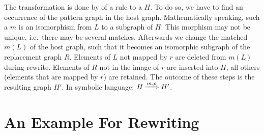 The transformation is done by  of a rule to a  $H$.
To do so, we have to find an occurrence of the pattern graph in the host graph.
Mathematically speaking, such a  $m$ is an isomorphism from $L$ to a subgraph of $H$.
This morphism may not be unique, i.e.\ there may be several matches.
Afterwards we change the matched  $m(L)$ of the host graph, such that it becomes an isomorphic subgraph of the replacement graph $R$.
Elements of $L$ not mapped by $r$ are deleted from $m(L)$ during rewrite.
Elements of $R$ not in the image of $r$ are inserted into $H$, all others (elements that are mapped by $r$) are retained.
The outcome of these steps is the resulting graph $H'$. In symbolic language: $H \xRightarrow{m, p} H'$.


\section{An Example For Rewriting}
\label{ov:example}

